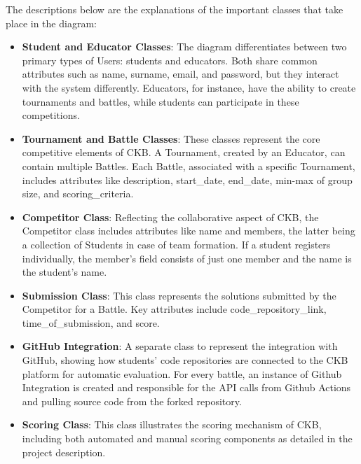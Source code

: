 The descriptions below are the explanations of the important classes that take place in the diagram:
\begin{itemize}
    \item \textbf{Student and Educator Classes}: The diagram differentiates between two primary types of Users: students and educators. Both share common attributes such as name, surname, email, and password, but they interact with the system differently. Educators, for instance, have the ability to create tournaments and battles, while students can participate in these competitions.
    \item \textbf{Tournament and Battle Classes}: These classes represent the core competitive elements of CKB. A Tournament, created by an Educator, can contain multiple Battles. Each Battle, associated with a specific Tournament, includes attributes like description, start\_date, end\_date, min-max of group size, and scoring\_criteria.
    \item \textbf{Competitor Class}: Reflecting the collaborative aspect of CKB, the Competitor class includes attributes like name and members, the latter being a collection of Students in case of team formation. If a student registers individually, the member's field consists of just one member and the name is the student's name.
    \item \textbf{Submission Class}: This class represents the solutions submitted by the Competitor for a Battle. Key attributes include code\_repository\_link, time\_of\_submission, and score.
    \item \textbf{GitHub Integration}: A separate class to represent the integration with GitHub, showing how students' code repositories are connected to the CKB platform for automatic evaluation. For every battle, an instance of Github Integration is created and responsible for the API calls from Github Actions and pulling source code from the forked repository.
    \item \textbf{Scoring Class}: This class illustrates the scoring mechanism of CKB, including both automated and manual scoring components as detailed in the project description.
\end{itemize}

\newpage
